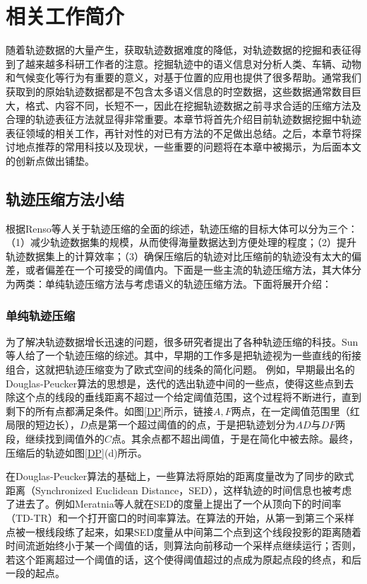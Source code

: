 
\chapter{相关工作简介}
\label{chapter:rw}

随着轨迹数据的大量产生，获取轨迹数据难度的降低，对轨迹数据的挖掘和表征得到了越来越多科研工作者的注意。挖掘轨迹中的语义信息对分析人类、车辆、动物和气候变化等行为有重要的意义，对基于位置的应用也提供了很多帮助。通常我们获取到的原始轨迹数据都是不包含太多语义信息的时空数据，这些数据通常数目巨大，格式、内容不同，长短不一，因此在挖掘轨迹数据之前寻求合适的压缩方法及合理的轨迹表征方法就显得非常重要。本章节将首先介绍目前轨迹数据挖掘中轨迹表征领域的相关工作，再针对性的对已有方法的不足做出总结。之后，本章节将探讨地点推荐的常用科技以及现状，一些重要的问题将在本章中被揭示，为后面本文的创新点做出铺垫。



\section{轨迹压缩方法小结}
根据Renso等人\cite{Renso:2013:MDM:2553228}关于轨迹压缩的全面的综述，轨迹压缩的目标大体可以分为三个：（1）减少轨迹数据集的规模，从而使得海量数据达到方便处理的程度；（2）提升轨迹数据集上的计算效率；（3）确保压缩后的轨迹对比压缩前的轨迹没有太大的偏差，或者偏差在一个可接受的阈值内。下面是一些主流的轨迹压缩方法，其大体分为两类：单纯轨迹压缩方法与考虑语义的轨迹压缩方法。下面将展开介绍：

\subsection{单纯轨迹压缩}
为了解决轨迹数据增长迅速的问题，很多研究者提出了各种轨迹压缩的科技。Sun等人\cite{sun2016overview}给了一个轨迹压缩的综述。其中，早期的工作多是把轨迹视为一些直线的衔接组合，这就把轨迹压缩变为了欧式空间的线条的简化问题。 例如，早期最出名的Douglas-Peucker算法\cite{douglas1973algorithms}的思想是，迭代的选出轨迹中间的一些点，使得这些点到去除这个点的线段的垂线距离不超过一个给定阈值范围，这个过程将不断进行，直到剩下的所有点都满足条件。如图\ref{DP}所示，链接$A,F$两点，在一定阈值范围里（红局限的短边长），$D$点是第一个超过阈值的的点，于是把轨迹划分为$AD$与$DF$两段，继续找到阈值外的$C$点。其余点都不超出阈值，于是在简化中被去除。最终，压缩后的轨迹如图\ref{DP}(d)所示。


在Douglas-Peucker算法的基础上，一些算法\cite{meratnia2004spatiotemporal,potamias2006sampling}将原始的距离度量改为了同步的欧式距离（Synchronized Euclidean Distance，SED），这样轨迹的时间信息也被考虑了进去了。例如Meratnia等人\cite{meratnia2004spatiotemporal}就在SED的度量上提出了一个从顶向下的时间率（TD-TR）和一个打开窗口的时间率算法。在算法的开始，从第一到第三个采样点被一根线段练了起来，如果SED度量从中间第二个点到这个线段投影的距离随着时间流逝始终小于某一个阈值的话，则算法向前移动一个采样点继续运行；否则，若这个距离超过一个阈值的话，这个使得阈值超过的点成为原起点段的终点，和后一段的起点。


